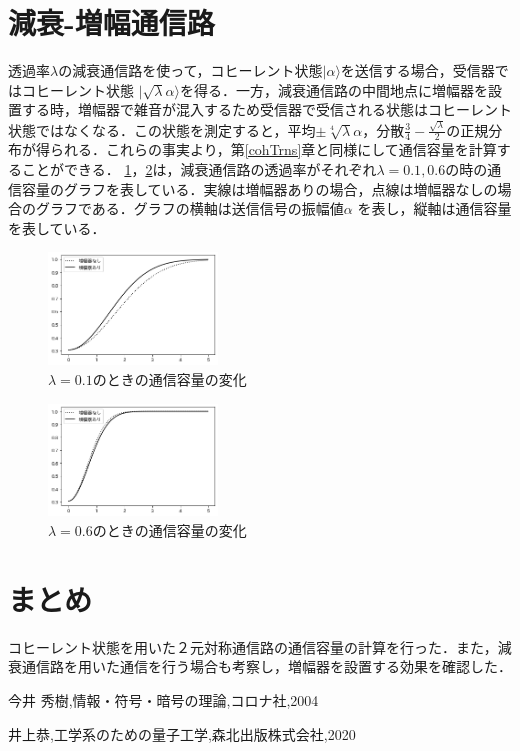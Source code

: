 \documentclass[a4j,twocolumn]{jarticle}
\def \figref #1{\figurename\ref{#1}}
\begin{document}
\section{減衰-増幅通信路}
透過率$\lambda$の減衰通信路を使って，コヒーレント状態$|\alpha\rangle$を送信する場合，受信器ではコヒーレント状態
$|\sqrt{\lambda}\alpha\rangle$を得る．一方，減衰通信路の中間地点に増幅器を設置する時，増幅器で雑音が混入するため受信器で受信される状態はコヒーレント状態ではなくなる．この状態を測定すると，平均$\pm \sqrt[4]{\lambda}\alpha$，分散$\frac 34-\frac{\sqrt{\lambda}}{2}$の正規分布が得られる．これらの事実より，第\ref{cohTrns}章と同様にして通信容量を計算することができる．
\figref{Fig5_2}，\figref{Fig5_5}は，減衰通信路の透過率がそれぞれ$\lambda=0.1,0.6$の時の通信容量のグラフを表している．実線は増幅器ありの場合，点線は増幅器なしの場合のグラフである．グラフの横軸は送信信号の振幅値$\alpha$ を表し，縦軸は通信容量を表している．

    \begin{figure}[H]
        \centering   
        \includegraphics[width=0.4\textwidth]{img/Fig5_2.png}
        \caption[sample image (png)]{$\lambda=0.1$のときの通信容量の変化}
        \label{Fig5_2}
    \end{figure}
    
    \begin{figure}[H]
        \centering   
        \includegraphics[width=0.4\textwidth]{img/Fig5_5.png}
        \caption[sample image (png)]{$\lambda=0.6$のときの通信容量の変化}
        \label{Fig5_5}
    \end{figure}

\section{まとめ}
コヒーレント状態を用いた２元対称通信路の通信容量の計算を行った．また，減衰通信路を用いた通信を行う場合も考察し，増幅器を設置する効果を確認した．


\begin{thebibliography}{9}
今井 秀樹,情報・符号・暗号の理論,コロナ社,2004 

井上恭,工学系のための量子工学,森北出版株式会社,2020 
\end{thebibliography}
\end{document}
